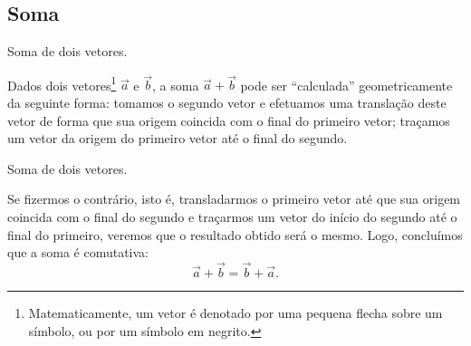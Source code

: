 \subsection{Soma}

\begin{marginfigure}
\centering
{}
\caption{Soma de dois vetores.}
\end{marginfigure}

Dados dois vetores\footnote{Matematicamente, um vetor é denotado por uma pequena flecha sobre um símbolo, ou por um símbolo em negrito.} $\vec{a}$ e $\vec{b}$, a soma $\vec{a}+\vec{b}$ pode ser ``calculada'' geometricamente da seguinte forma: tomamos o segundo vetor e efetuamos uma translação deste vetor de forma que sua origem coincida com o final do primeiro vetor; traçamos um vetor da origem do primeiro vetor até o final do segundo. 

\begin{marginfigure}
\centering
{}
\caption{Soma de dois vetores.}
\end{marginfigure}

Se fizermos o contrário, isto é, transladarmos o primeiro vetor até que sua origem coincida com o final do segundo e traçarmos um vetor do início do segundo até o final do primeiro, veremos que o resultado obtido será o mesmo. Logo, concluímos que a soma é comutativa:
\begin{equation}
  \vec{a} + \vec{b} = \vec{b} + \vec{a}.
\end{equation}

